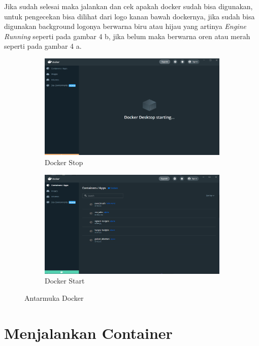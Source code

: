 \documentclass[11pt,a4paper]{article}
\begin{document}
 \newline
 Jika sudah selesai maka jalankan dan cek apakah docker sudah bisa digunakan, untuk pengecekan bisa dilihat dari logo kanan bawah dockernya, jika sudah bisa digunakan background logonya berwarna biru atau hijau yang artinya \textit{Engine Running} seperti pada gambar 4 b, jika belum maka berwarna oren atau merah seperti pada gambar 4 a.
 \begin{figure}[h]
	\centering
	\begin{subfigure}[b]{0.4\textwidth}
		\centering
		\def\svgwidth{\columnwidth}
		\includegraphics[width=1\textwidth]{Figure/5. wait.png}
		\caption{Docker Stop}
	\end{subfigure}
	\qquad
	\begin{subfigure}[b]{0.4\textwidth}
		\centering
		\def\svgwidth{\columnwidth}
		\includegraphics[width=1\textwidth]{Figure/12. docker.png}
		\caption{Docker Start}
	\end{subfigure}
	\caption{Antarmuka Docker}
\end{figure}

 \section{Menjalankan Container}
\end{document}
